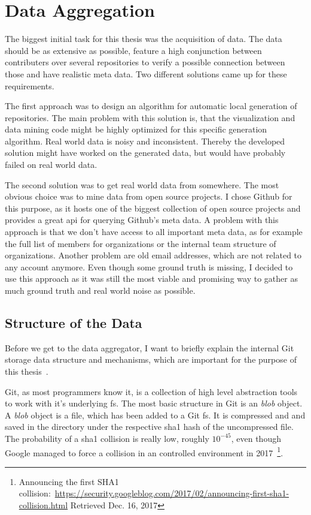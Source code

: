 \chapter{Data Aggregation}\label{data-aggregation}

The biggest initial task for this thesis was the acquisition of data.
The data should be as extensive as possible, feature a high conjunction between contributers over several repositories to verify a possible connection between those and have realistic meta data.
Two different solutions came up for these requirements.

The first approach was to design an algorithm for automatic local generation of repositories.
The main problem with this solution is, that the visualization and data mining code might be highly optimized for this specific generation algorithm.
Real world data is noisy and inconsistent. Thereby the developed solution might have worked on the generated data, but would have probably failed on real world data.

The second solution was to get real world data from somewhere. The most obvious choice was to mine data from open source projects.
I chose Github for this purpose, as it hosts one of the biggest collection of open source projects and provides a great \ac{api} for querying Github's meta data.
A problem with this approach is that we don't have access to all important meta data, as for example the full list of members for organizations or the internal team structure of organizations.
Another problem are old email addresses, which are not related to any account anymore.
Even though some ground truth is missing, I decided to use this approach as it was still the most viable and promising way to gather as much ground truth and real world noise as possible.


\section{Structure of the Data}

Before we get to the data aggregator, I want to briefly explain the internal Git storage data structure and mechanisms, which are important for the purpose of this thesis~\cite{book:pro-git}.

Git, as most programmers know it, is a collection of high level abstraction tools to work with it's underlying \ac{fs}.
The most basic structure in Git is an \emph{blob} object.
A \emph{blob} object is a file, which has been added to a Git \ac{fs}. It is compressed and and saved in the  directory under the respective \ac{sha1} hash of the uncompressed file.
The probability of a \ac{sha1} collision is really low, roughly $10^{-45}$, even though Google managed to force a collision in an controlled environment in 2017~\footnote{Announcing the first SHA1 collision:~\url{https://security.googleblog.com/2017/02/announcing-first-sha1-collision.html} Retrieved Dec. 16, 2017}.

